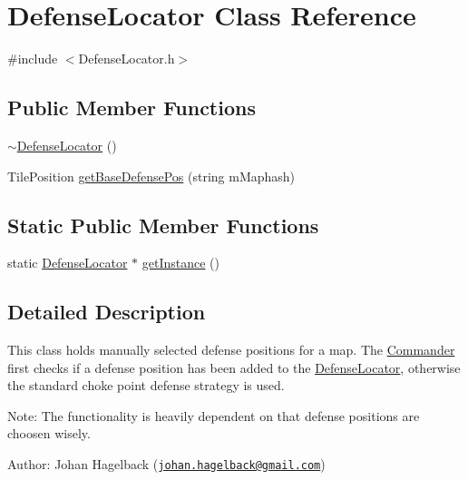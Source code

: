 \hypertarget{class_defense_locator}{\section{Defense\-Locator Class Reference}
\label{class_defense_locator}
}


{\ttfamily \#include $<$Defense\-Locator.\-h$>$}

\subsection*{Public Member Functions}
\begin{DoxyCompactItemize}
\item 
\hyperlink{class_defense_locator_a0e807e3b2d2b2f833441f57a513ff1b2}{$\sim$\-Defense\-Locator} ()
\item 
Tile\-Position \hyperlink{class_defense_locator_a133a0b22e4e8372e85a8e545d28099da}{get\-Base\-Defense\-Pos} (string m\-Maphash)
\end{DoxyCompactItemize}
\subsection*{Static Public Member Functions}
\begin{DoxyCompactItemize}
\item 
static \hyperlink{class_defense_locator}{Defense\-Locator} $\ast$ \hyperlink{class_defense_locator_a17e896385df7bb1d75acc2385f51d2ae}{get\-Instance} ()
\end{DoxyCompactItemize}


\subsection{Detailed Description}
This class holds manually selected defense positions for a map. The \hyperlink{class_commander}{Commander} first checks if a defense position has been added to the \hyperlink{class_defense_locator}{Defense\-Locator}, otherwise the standard choke point defense strategy is used.

Note\-: The functionality is heavily dependent on that defense positions are choosen wisely.

Author\-: Johan Hagelback (\href{mailto:johan.hagelback@gmail.com}{\tt johan.\-hagelback@gmail.\-com}) 


